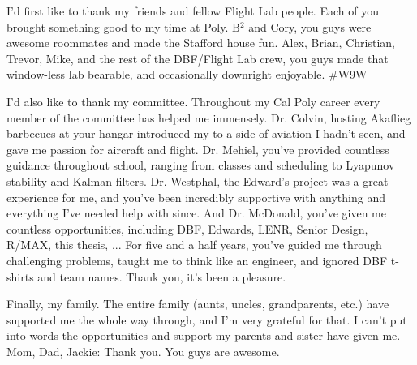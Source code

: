I'd first like to thank my friends and fellow Flight Lab people. Each of you brought something good to my time at Poly. B$^2$ and Cory, you guys were awesome roommates and made the Stafford house fun. Alex, Brian, Christian, Trevor, Mike, and the rest of the DBF/Flight Lab crew, you guys made that window-less lab bearable, and occasionally downright enjoyable. \#W9W

I'd also like to thank my committee. Throughout my Cal Poly career every member of the committee has helped me immensely. Dr. Colvin, hosting Akaflieg barbecues at your hangar introduced my to a side of aviation I hadn't seen, and gave me passion for aircraft and flight. Dr. Mehiel, you've provided countless guidance throughout school, ranging from classes and scheduling to Lyapunov stability and Kalman filters. Dr. Westphal, the Edward's project was a great experience for me, and you've been incredibly supportive with anything and everything I've needed help with since. And Dr. McDonald, you've given me countless opportunities, including DBF, Edwards, LENR, Senior Design, R/MAX, this thesis, ... For five and a half years, you've guided me through challenging problems, taught me to think like an engineer, and ignored DBF t-shirts and team names. Thank you, it's been a pleasure.

Finally, my family. The entire family (aunts, uncles, grandparents, etc.) have supported me the whole way through, and I'm very grateful for that. I can't put into words the opportunities and support my parents and sister have given me. Mom, Dad, Jackie: Thank you. You guys are awesome.